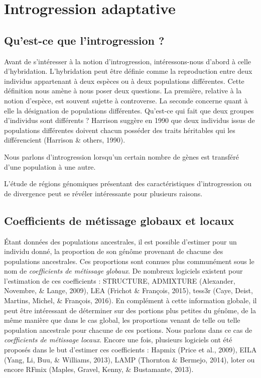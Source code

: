 \documentclass[12pt,twoside]{ugathesis}
\begin{document}
\newpage



\newpage

\chapter{Introgression adaptative}\label{introgression-adaptative}

\section{Qu'est-ce que l'introgression
?}\label{quest-ce-que-lintrogression}

Avant de s'intéresser à la notion d'introgression, intéressons-nous
d'abord à celle d'hybridation. L'hybridation peut être définie comme la
reproduction entre deux individus appartenant à deux espèces ou à deux
populations différentes. Cette définition nous amène à nous poser deux
questions. La première, relative à la notion d'espèce, est souvent
sujette à controverse. La seconde concerne quant à elle la désignation
de populations différentes. Qu'est-ce qui fait que deux groupes
d'individus sont différents ? Harrison suggère en 1990 que deux
individus issus de populations différentes doivent chacun posséder des
traits héritables qui les différencient (Harrison \& others, 1990).

Nous parlons d'introgression lorsqu'un certain nombre de gènes est
transféré d'une population à une autre.

L'étude de régions génomiques présentant des caractéristiques
d'introgression ou de divergence peut se révéler intéressante pour
plusieurs raisons.

\section{Coefficients de métissage globaux et
locaux}\label{coefficients-de-metissage-globaux-et-locaux}

Étant données des populations ancestrales, il est possible d'estimer
pour un individu donné, la proportion de son génôme provenant de chacune
des populations ancestrales. Ces proportions sont connues plus
communément sous le nom de \emph{coefficients de métissage globaux}. De
nombreux logiciels existent pour l'estimation de ces coefficients :
STRUCTURE, ADMIXTURE (Alexander, Novembre, \& Lange, 2009), LEA (Frichot
\& François, 2015), tess3r (Caye, Deist, Martins, Michel, \& François,
2016). En complément à cette information globale, il peut être
intéressant de déterminer sur des portions plus petites du génôme, de la
même manière que dans le cas global, les proportions venant de telle ou
telle population ancestrale pour chacune de ces portions. Nous parlons
dans ce cas de \emph{coefficients de métissage locaux}. Encore une fois,
plusieurs logiciels ont été proposés dans le but d'estimer ces
coefficients : Hapmix (Price et al., 2009), EILA (Yang, Li, Buu, \&
Williams, 2013), LAMP (Thornton \& Bermejo, 2014), loter ou encore RFmix
(Maples, Gravel, Kenny, \& Bustamante, 2013).
\end{document}
